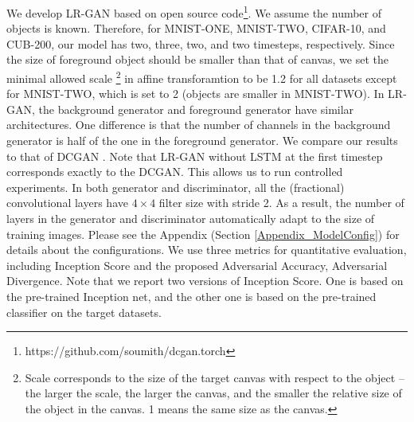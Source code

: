 \documentclass{article} \usepackage{iclr2017_conference,times}
\begin{document}
We develop LR-GAN based on open source code\footnote{https://github.com/soumith/dcgan.torch}. We assume the number of objects is known. Therefore, for MNIST-ONE, MNIST-TWO, CIFAR-10, and CUB-200, our model has two, three, two, and two timesteps, respectively. Since the size of foreground object should be smaller than that of canvas, we set the minimal allowed scale \footnote{Scale corresponds to the size of the target canvas with respect to the object -- the larger the scale, the larger the canvas, and the smaller the relative size of the object in the canvas. 1 means the same size as the canvas.} in affine transforamtion to be 1.2 for all datasets except for MNIST-TWO, which is set to 2 (objects are smaller in MNIST-TWO). In LR-GAN, the background generator and foreground generator have similar architectures. One difference is that the number of channels in the background generator is half of the one in the foreground generator. We compare our results to that of DCGAN \citep{DCGAN}. Note that LR-GAN without LSTM at the first timestep corresponds exactly to the DCGAN. This allows us to run controlled experiments. In both generator and discriminator, all the (fractional) convolutional layers have $4\times4$ filter size with stride 2. As a result, the number of layers in the generator and discriminator automatically adapt to the size of training images. Please see the Appendix (Section \ref{Appendix_ModelConfig}) for details about the configurations. We use three metrics for quantitative evaluation, including Inception Score \citep{ImprovedGAN} and the proposed Adversarial Accuracy, Adversarial Divergence. Note that we report two versions of Inception Score. One is based on the pre-trained Inception net, and the other one is based on the pre-trained classifier on the target datasets.
\end{document}

